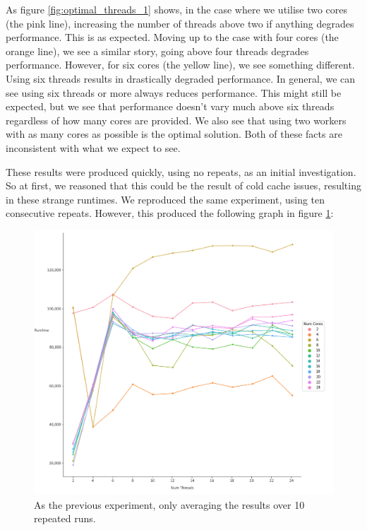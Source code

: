 As figure \ref{fig:optimal_threads_1} shows, in the case where we utilise two cores (the pink line), increasing the number of threads above two if anything degrades performance. This is as expected. Moving up to the case with four cores (the orange line), we see a similar story, going above four threads degrades performance. However, for six cores (the yellow line), we see something different. Using six threads results in drastically degraded performance. In general, we can see using six threads or more always reduces performance. This might still be expected, but we see that performance doesn't vary much above six threads regardless of how many cores are provided. We also see that using two workers with as many cores as possible is the optimal solution. Both of these facts are inconsistent with what we expect to see.

These results were produced quickly, using no repeats, as an initial investigation. So at first, we reasoned that this could be the result of cold cache issues, resulting in these strange runtimes. We reproduced the same experiment, using ten consecutive repeats. However, this produced the following graph in figure \ref{fig:optimal_threads_1_(repeats)}:



\begin{figure}[H]
    \includegraphics[width=1\textwidth]{graphics/optimal_threads_1_(repeats).png}
    \caption{As the previous experiment, only averaging the results over 10 repeated runs.}
    \label{fig:optimal_threads_1_(repeats)}
\end{figure}



